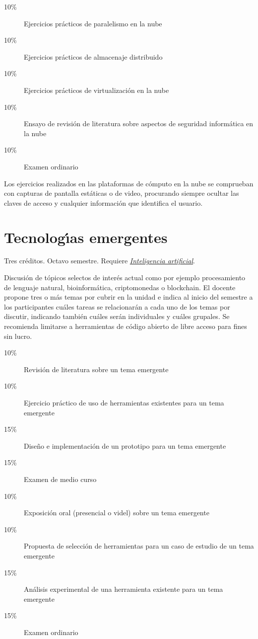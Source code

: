 \documentclass{article}
\begin{document}
\begin{multicols}{4}
\begin{description}
\item[10\%]{Ejercicios pr\'{a}cticos de paralelismo en la nube}
\item[10\%]{Ejercicios pr\'{a}cticos de almacenaje distribuido}
\item[10\%]{Ejercicios pr\'{a}cticos de virtualizaci\'{o}n en la nube}
\item[10\%]{Ensayo de revisi\'{o}n de literatura sobre aspectos de
  seguridad inform\'{a}tica en la nube}
\item[10\%]{Examen ordinario}
\end{description}  

Los ejercicios realizados en las plataformas de c\'{o}mputo en la nube se
comprueban con capturas de pantalla est\'{a}ticas o de video, procurando
siempre ocultar las claves de acceso y cualquier informaci\'{o}n que
identifica el usuario.

\newpage

\hypertarget{te}{\section*{Tecnolog\'{\i}as emergentes}} 

Tres cr\'{e}ditos. Octavo semestre. Requiere \hyperlink{ia}{\em
  Inteligencia artificial}.

Discusi\'{o}n de t\'{o}picos selectos de inter\'{e}s actual como por
ejemplo procesamiento de lenguaje natural, bioinform\'{a}tica,
criptomonedas o blockchain. El docente propone tres o m\'{a}s temas por
cubrir en la unidad e indica al inicio del semestre a los
participantes cu\'{a}les tareas se relacionar\'{a}n a cada uno de los temas
por discutir, indicando tambi\'{e}n cu\'{a}les ser\'{a}n individuales y cu\'{a}les
grupales. Se recomienda limitarse a herramientas de c\'{o}digo abierto de
libre acceso para fines sin lucro.

\begin{description}
\item[10\%]{Revisi\'{o}n de literatura sobre un tema emergente}
\item[10\%]{Ejercicio pr\'{a}ctico de uso de herramientas existentes para
  un tema emergente}
\item[15\%]{Dise\~{n}o e implementaci\'{o}n de un prototipo para un tema
  emergente}
\item[15\%]{Examen de medio curso}
\item[10\%]{Exposici\'{o}n oral (presencial o videl) sobre un tema
  emergente}
\item[10\%]{Propuesta de selecci\'{o}n de herramientas para un caso de
  estudio de un tema emergente}
\item[15\%]{An\'{a}lisis experimental de una herramienta existente para un
  tema emergente}
\item[15\%]{Examen ordinario}
\end{description}  


\end{multicols}
\end{document}
